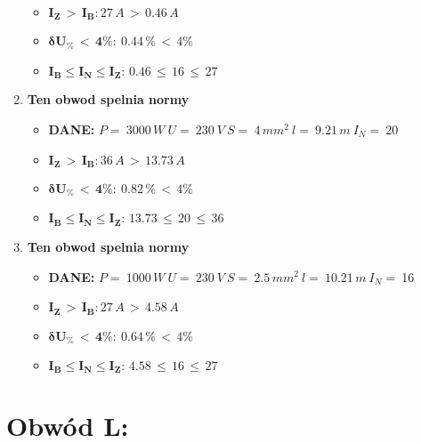 \begin{enumerate}
\begin{itemize}
\item[\textcolor{Green}{\cmark}] $ \pmb{I_Z \, >  \, I_B: }27 \, A \, > \,0.46 \, A $
\item[\textcolor{Green}{\cmark}] $ \pmb{ \delta U_\% \, < \, 4\%:} \:0.44 \, \% \,< \, 4\% $
\item[\textcolor{Green}{\cmark}] $ \pmb{I_B \le I_N \le I_Z: } \, 0.46 \, \le \,16 \, \le \,27 $
\end{itemize}
\item \textcolor{Green}{\cmark} \textbf{Ten obwod spelnia normy} 
\begin{itemize}
\item[] \textbf{DANE: } \: $ P = \:3000\, W\: U = \:230\: V\: S = \:4\, mm^2\: l = \:9.21\, m\: I_N= \: $20
\item[\textcolor{Green}{\cmark}] $ \pmb{I_Z \, >  \, I_B: }36 \, A \, > \,13.73 \, A $
\item[\textcolor{Green}{\cmark}] $ \pmb{ \delta U_\% \, < \, 4\%:} \:0.82 \, \% \,< \, 4\% $
\item[\textcolor{Green}{\cmark}] $ \pmb{I_B \le I_N \le I_Z: } \, 13.73 \, \le \,20 \, \le \,36 $
\end{itemize}
\item \textcolor{Green}{\cmark} \textbf{Ten obwod spelnia normy} 
\begin{itemize}
\item[] \textbf{DANE: } \: $ P = \:1000\, W\: U = \:230\: V\: S = \:2.5\, mm^2\: l = \:10.21\, m\: I_N= \: $16
\item[\textcolor{Green}{\cmark}] $ \pmb{I_Z \, >  \, I_B: }27 \, A \, > \,4.58 \, A $
\item[\textcolor{Green}{\cmark}] $ \pmb{ \delta U_\% \, < \, 4\%:} \:0.64 \, \% \,< \, 4\% $
\item[\textcolor{Green}{\cmark}] $ \pmb{I_B \le I_N \le I_Z: } \, 4.58 \, \le \,16 \, \le \,27 $
\end{itemize}
\end{enumerate}
\section{Obwód L:}

